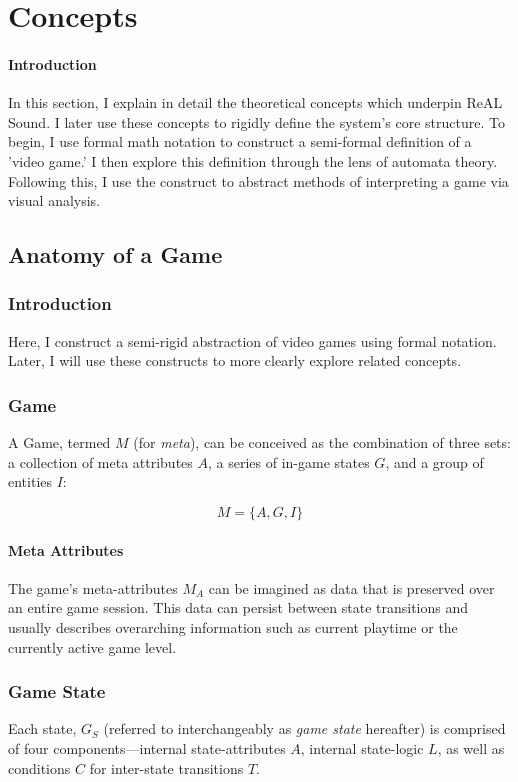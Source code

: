 \documentclass{report}
\newcommand{\rs}{ReAL Sound\xspace}
\begin{document}
\section{Concepts}
\paragraph{Introduction} 
In this section, I explain in detail the theoretical concepts which underpin \rs. I later use these concepts to rigidly define the system's core structure. To begin, I use formal math notation to construct a semi-formal definition of a 'video game.' I then explore this definition through the lens of automata theory. Following this, I use the construct to abstract methods of interpreting a game via visual analysis. 


\subsection{Anatomy of a Game}
\subsubsection{Introduction}
Here, I construct a semi-rigid abstraction of video games using formal notation. Later, I will use these constructs to more clearly explore related concepts.


\subsubsection{Game}
A Game, termed $M$ (for \emph{meta}), can be conceived as the combination of three sets: a collection of meta attributes $A$, a series of in-game states $G$, and a group of entities $I$:

$$
M = \{A, G, I\}
$$

\paragraph{Meta Attributes}
The game's meta-attributes $M_A$ can be imagined as data that is preserved over an entire game session. This data can persist between state transitions and usually describes overarching information such as current playtime or the currently active game level. 

\subsubsection{Game State}
Each state, $G_S$ (referred to interchangeably as \textit{game state} hereafter) is comprised of four components---internal state-attributes $A$, internal state-logic $L$, as well as conditions $C$ for inter-state transitions $T$.
\end{document}
